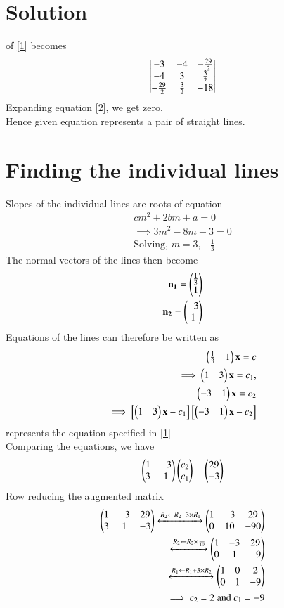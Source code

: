 \documentclass[journal,12pt,twocolumn]{IEEEtran}
\begin{document}
\section{Solution}
 of \eqref{1} becomes
\begin{align}
    \begin{vmatrix}-3&-4&-\frac{29}{2}\\-4&3&\frac{3}{2}\\-\frac{29}{2}&\frac{3}{2}&-18\end{vmatrix}\label{2}
\end{align}
Expanding equation \eqref{2}, we get zero.\\
Hence given equation represents a pair of straight lines.
\section{Finding the individual lines}
Slopes of the individual lines are roots of equation 
\begin{align}
    cm^2+2bm+a=0\\
    \implies 3m^2-8m-3=0\\
    \text{Solving, }m=3,-\frac{1}{3}
\end{align}
The normal vectors of the lines then become
\begin{align}
    \mathbf{n_1}=\begin{pmatrix}\frac{1}{3}\\1\end{pmatrix}\\
    \mathbf{n_2}=\begin{pmatrix}-3\\1\end{pmatrix}
\end{align}
Equations of the lines can therefore be written as
\begin{align}
  \begin{pmatrix}\frac{1}{3}&1\end{pmatrix}\mathbf{x}=c\\
 \implies \begin{pmatrix}1&3\end{pmatrix}\mathbf{x}=c_1 ,\\
   \begin{pmatrix}-3&1\end{pmatrix}\mathbf{x}=c_2\\
  \implies \left[\begin{pmatrix}1&3\end{pmatrix}\mathbf{x}-c_1\right]\left[\begin{pmatrix}-3&1\end{pmatrix}\mathbf{x}-c_2\right]
\end{align}
represents the equation specified in \eqref{1}\\
Comparing the equations, we have
\begin{align}
    \begin{pmatrix}1&-3\\3&1\end{pmatrix}\begin{pmatrix}c_2\\c_1\end{pmatrix}=\begin{pmatrix}29\\-3\end{pmatrix}\\
 \end{align}
 Row reducing the augmented matrix
 \begin{align}
    \begin{pmatrix}1&-3&29\\3&1&-3\end{pmatrix}\xleftrightarrow[]{R_2\leftarrow R_2-3\times R_1}
    \begin{pmatrix}1&-3&29\\0&10&-90\end{pmatrix}\\
    \xleftrightarrow[]{R_2\leftarrow R_2\times \frac{1}{10}}
    \begin{pmatrix}1&-3&29\\0&1&-9\end{pmatrix}\\
    \xleftrightarrow[]{R_1\leftarrow R_1+3\times R_2}
    \begin{pmatrix}1&0&2\\0&1&-9\end{pmatrix}\\
    \implies c_2=2 \text{ and }c_1=-9
\end{align}
\end{document}
